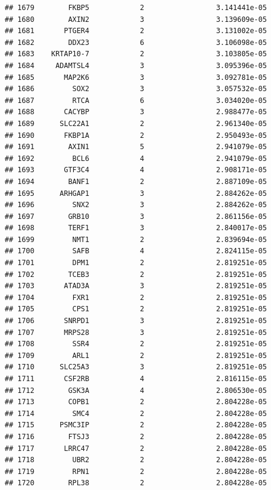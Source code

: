 \documentclass[
]{article}
\begin{document}
\begin{verbatim}
## 1679        FKBP5            2                 3.141441e-05
## 1680        AXIN2            3                 3.139609e-05
## 1681       PTGER4            2                 3.131002e-05
## 1682        DDX23            6                 3.106098e-05
## 1683    KRTAP10-7            2                 3.103805e-05
## 1684     ADAMTSL4            3                 3.095396e-05
## 1685       MAP2K6            3                 3.092781e-05
## 1686         SOX2            3                 3.057532e-05
## 1687         RTCA            6                 3.034020e-05
## 1688       CACYBP            3                 2.988477e-05
## 1689      SLC22A1            2                 2.961340e-05
## 1690       FKBP1A            2                 2.950493e-05
## 1691        AXIN1            5                 2.941079e-05
## 1692         BCL6            4                 2.941079e-05
## 1693       GTF3C4            4                 2.908171e-05
## 1694        BANF1            2                 2.887109e-05
## 1695      ARHGAP1            3                 2.884262e-05
## 1696         SNX2            3                 2.884262e-05
## 1697        GRB10            3                 2.861156e-05
## 1698        TERF1            3                 2.840017e-05
## 1699         NMT1            2                 2.839694e-05
## 1700         SAFB            4                 2.824115e-05
## 1701         DPM1            2                 2.819251e-05
## 1702        TCEB3            2                 2.819251e-05
## 1703       ATAD3A            3                 2.819251e-05
## 1704         FXR1            2                 2.819251e-05
## 1705         CPS1            2                 2.819251e-05
## 1706       SNRPD1            3                 2.819251e-05
## 1707       MRPS28            3                 2.819251e-05
## 1708         SSR4            2                 2.819251e-05
## 1709         ARL1            2                 2.819251e-05
## 1710      SLC25A3            3                 2.819251e-05
## 1711       CSF2RB            4                 2.816115e-05
## 1712        GSK3A            4                 2.806530e-05
## 1713        COPB1            2                 2.804228e-05
## 1714         SMC4            2                 2.804228e-05
## 1715      PSMC3IP            2                 2.804228e-05
## 1716        FTSJ3            2                 2.804228e-05
## 1717       LRRC47            2                 2.804228e-05
## 1718         UBR2            2                 2.804228e-05
## 1719         RPN1            2                 2.804228e-05
## 1720        RPL38            2                 2.804228e-05

\end{verbatim}
\end{document}

